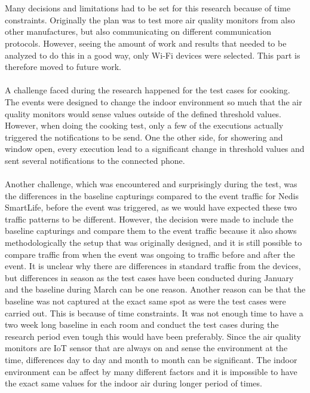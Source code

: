 \\\\
Many decisions and limitations had to be set for this research because of time constraints. Originally the plan was to test more air quality monitors from also other manufactures, but also communicating on different communication protocols. However, seeing the amount of work and results that needed to be analyzed to do this in a good way, only Wi-Fi devices were selected. This part is therefore moved to future work.  
\\\\
A challenge faced during the research happened for the test cases for cooking. The events were designed to change the indoor environment so much that the air quality monitors would sense values outside of the defined threshold values. However, when doing the cooking test, only a few of the executions actually triggered the notifications to be send. One the other side, for showering and window open, every execution lead to a significant change in threshold values and sent several notifications to the connected phone. 
\\\\
Another challenge, which was encountered and surprisingly during the test, was the differences in the baseline capturings compared to the event traffic for Nedis SmartLife, before the event was triggered, as we would have expected these two traffic patterns to be different. However, the decision were made to include the baseline capturings and compare them to the event traffic because it also shows methodologically the setup that was originally designed, and it is still possible to compare traffic from when the event was ongoing to traffic before and after the event. It is unclear why there are differences in standard traffic from the devices, but differences in season as the test cases have been conducted during January and the baseline during March can be one reason. Another reason can be that the baseline was not captured at the exact same spot as were the test cases were carried out. This is because of time constraints. It was not enough time to have a two week long baseline in each room and conduct the test cases during the research period even tough this would have been preferably. Since the air quality monitors are IoT sensor that are always on and sense the environment at the time, differences day to day and month to month can be significant. The indoor environment can be affect by many different factors and it is impossible to have the exact same values for the indoor air during longer period of times. 
